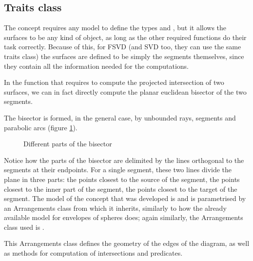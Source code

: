 \documentclass[11pt,a4paper,english]{article}
\begin{document}
	\subsection{Traits class }
	The  concept requires any model to define the types  and , but it allows the surfaces to be any kind of object, as long as the other required functions do their task correctly. Because of this, for FSVD (and SVD too, they can use the same traits class) the surfaces are defined to be simply the segments themselves, since they contain all the information needed for the computations.\par
	In the function that requires to compute the projected intersection of two surfaces, we can in fact directly compute the planar euclidean bisector of the two segments.\par
	The bisector is formed, in the general case, by unbounded rays, segments and parabolic arcs (figure \ref{fig:areas_of_influence}).\ppar
	\begin{figure}[h]
    \centering
    \caption{Different parts of the bisector\label{fig:areas_of_influence}}
	\end{figure}
	Notice how the parts of the bisector are delimited by the lines orthogonal to the segments at their endpoints. For a single segment, these two lines divide the plane in three parts: the points closest to the source of the segment, the points closest to the inner part of the segment, the points closest to the target of the segment.\ppar
	The model of the concept  that was developed is   and is parametrised by an Arrangements class from which it inherits, similarly to how the already available model  for envelopes of spheres does; again similarly, the Arrangements class used is .\par
	This Arrangements class defines the geometry of the edges of the diagram, as well as methods for computation of intersections and predicates.
	
\end{document}
